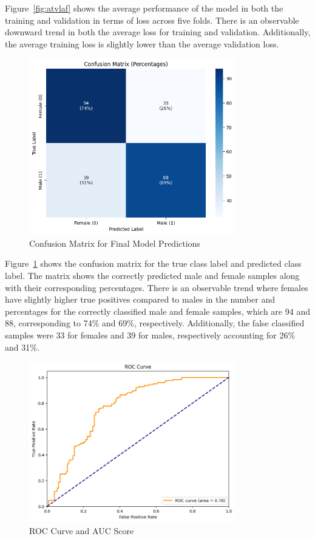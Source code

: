 Figure~\ref{fig:atvlaf} shows the average performance of the model in both the training and validation in terms of loss across five folds. There is an observable downward trend in both the average loss for training and validation. Additionally, the average training loss is slightly lower than the average validation loss.

\begin{figure}[!htbp]
	\centering
	\includegraphics[width=0.8\textwidth]{figures/cm_dl.png}
	\caption{Confusion Matrix for Final Model Predictions}
	\label{fig:cm_dl}
\end{figure}

Figure~\ref{fig:cm_dl} shows the confusion matrix for the true class label and predicted class label. The matrix shows the correctly predicted male and female samples along with their corresponding percentages. There is an observable trend where females have slightly higher true positives compared to males in the number and percentages for the correctly classified male and female samples, which are 94 and 88, corresponding to 74\% and 69\%, respectively. Additionally, the false classified samples were 33 for females and 39 for males, respectively accounting for 26\% and 31\%.

\begin{figure}[!htbp]
	\centering
	\includegraphics[width=0.8\textwidth]{figures/roc.png}
	\caption{ROC Curve and AUC Score}
	\label{fig:roc_auc}
\end{figure}

